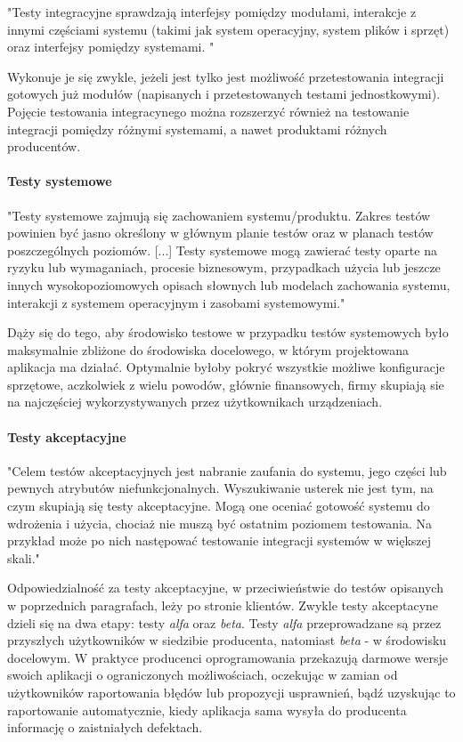 "Testy integracyjne sprawdzają interfejsy pomiędzy modułami, interakcje z innymi częściami systemu (takimi jak system operacyjny, system plików i sprzęt) oraz interfejsy pomiędzy systemami. "\cite{bib:sylabus:foundation}

Wykonuje je się zwykle, jeżeli jest tylko jest możliwość przetestowania integracji gotowych już modułów (napisanych i przetestowanych testami jednostkowymi). Pojęcie testowania integracynego można rozszerzyć również na testowanie integracji pomiędzy różnymi systemami, a nawet produktami różnych producentów. 

\paragraph{Testy systemowe}

"Testy systemowe zajmują się zachowaniem systemu/produktu. Zakres testów powinien być jasno określony w głównym planie testów oraz w planach testów poszczególnych poziomów. [...] Testy systemowe mogą zawierać testy oparte na ryzyku lub wymaganiach, procesie biznesowym, przypadkach użycia lub jeszcze innych wysokopoziomowych opisach słownych lub modelach zachowania systemu, interakcji z systemem operacyjnym i zasobami systemowymi."\cite{bib:sylabus:foundation}

Dąży się do tego, aby środowisko testowe w przypadku testów systemowych było maksymalnie zbliżone do środowiska docelowego, w którym projektowana aplikacja ma działać. Optymalnie byłoby pokryć wszystkie możliwe konfiguracje sprzętowe, aczkolwiek z wielu powodów, głównie finansowych, firmy skupiają sie na najczęściej wykorzystywanych przez użytkownikach urządzeniach. 

\paragraph{Testy akceptacyjne}

"Celem testów akceptacyjnych jest nabranie zaufania do systemu, jego części lub pewnych atrybutów niefunkcjonalnych. Wyszukiwanie usterek nie jest tym, na czym skupiają się testy akceptacyjne. Mogą one oceniać gotowość systemu do wdrożenia i użycia, chociaż nie muszą być ostatnim poziomem testowania. Na przykład może po nich następować testowanie integracji systemów w większej skali."\cite{bib:sylabus:foundation}

Odpowiedzialność za testy akceptacyjne, w przeciwieństwie do testów opisanych w poprzednich paragrafach, leży po stronie klientów. Zwykle testy akceptacyne dzieli się na dwa etapy: testy \textit{alfa} oraz \textit{beta}. Testy \textit{alfa} przeprowadzane są przez przyszłych użytkowników w siedzibie producenta, natomiast \textit{beta} - w środowisku docelowym. W praktyce producenci oprogramowania przekazują darmowe wersje swoich aplikacji o ograniczonych możliwościach, oczekując w zamian od użytkowników raportowania błędów lub propozycji usprawnień, bądź uzyskując to raportowanie automatycznie, kiedy aplikacja sama wysyła do producenta informację o zaistniałych defektach.

